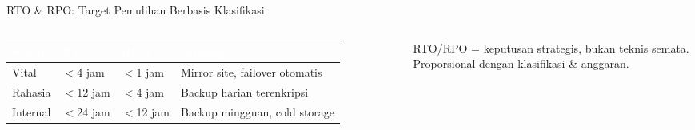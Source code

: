 \documentclass[aspectratio=169,11pt]{beamer}
\begin{document}
\begin{frame}{RTO \& RPO: Target Pemulihan Berbasis Klasifikasi}
\begin{columns}[T]
        \scriptsize
        \begin{tabularx}{\textwidth}{@{} >{\raggedright\arraybackslash}p{1.8cm} >{\centering\arraybackslash}p{1.6cm} >{\centering\arraybackslash}p{1.6cm} X @{}}
            \toprule
            \rowcolor{rowhead}
            \textcolor{white}{\textbf{Klasif.}} & \textcolor{white}{\textbf{RTO}} & \textcolor{white}{\textbf{RPO}} & \textcolor{white}{\textbf{Strategi}} \\
            \midrule
            \rowcolor{rowalt}
            Vital & $<$4 jam & $<$1 jam & Mirror site, failover otomatis \\
            Rahasia & $<$12 jam & $<$4 jam & Backup harian terenkripsi \\
            \rowcolor{rowalt}
            Internal & $<$24 jam & $<$12 jam & Backup mingguan, cold storage \\
            \bottomrule
        \end{tabularx}
        
        \vspace{0.2cm}
        \begin{greenbox}
            \scriptsize RTO/RPO = keputusan strategis, bukan teknis semata. Proporsional dengan klasifikasi \& anggaran.
        \end{greenbox}
    \end{columns}
\end{frame}
\end{document}

